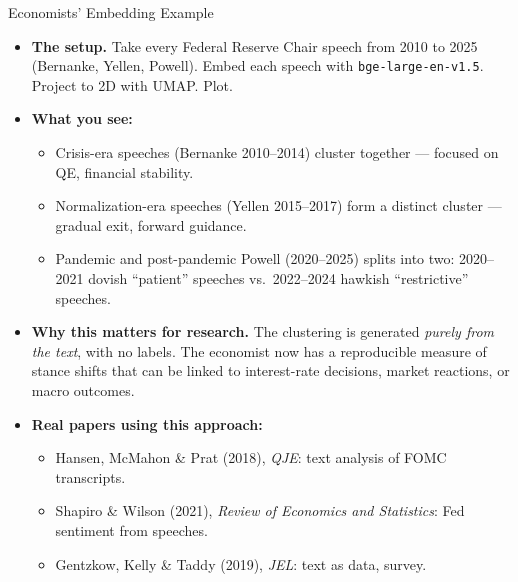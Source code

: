 \documentclass[10pt,english,aspectratio=169]{beamer}
\begin{document}
\begin{frame}{Economists' Embedding Example}
\begin{itemize}
\item \textbf{The setup.} Take every Federal Reserve Chair speech from 2010 to 2025 (Bernanke, Yellen, Powell). Embed each speech with \texttt{bge-large-en-v1.5}. Project to 2D with UMAP. Plot.

\medskip
\item \textbf{What you see:}
\begin{itemize}
    \item Crisis-era speeches (Bernanke 2010--2014) cluster together --- focused on QE, financial stability.
    \item Normalization-era speeches (Yellen 2015--2017) form a distinct cluster --- gradual exit, forward guidance.
    \item Pandemic and post-pandemic Powell (2020--2025) splits into two: 2020--2021 dovish ``patient'' speeches vs.\ 2022--2024 hawkish ``restrictive'' speeches.
\end{itemize}

\medskip
\item \textbf{Why this matters for research.} The clustering is generated \emph{purely from the text}, with no labels. The economist now has a reproducible measure of stance shifts that can be linked to interest-rate decisions, market reactions, or macro outcomes.

\medskip
\item \textbf{Real papers using this approach:}
\begin{itemize}
    \item Hansen, McMahon \& Prat (2018), \emph{QJE}: text analysis of FOMC transcripts.
    \item Shapiro \& Wilson (2021), \emph{Review of Economics and Statistics}: Fed sentiment from speeches.
    \item Gentzkow, Kelly \& Taddy (2019), \emph{JEL}: text as data, survey.
\end{itemize}
\end{itemize}
\end{frame}
\end{document}
